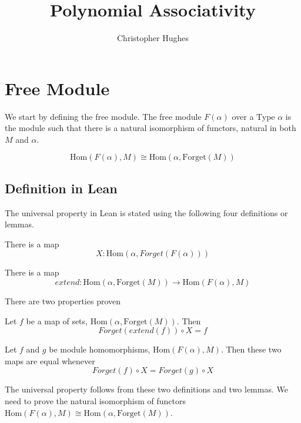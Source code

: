 \documentclass[12pt]{article} %
\title{Polynomial Associativity}
\author{Christopher Hughes}
\theoremstyle{definition}
\theoremstyle{definition}
\theoremstyle{definition}
\theoremstyle{definition}
\begin{document}
\section{Free Module}

We start by defining the free module. The free module $F(\alpha)$ over a Type $\alpha$ is the module
such that there is a natural isomorphism of functors, natural in both $M$ and $\alpha$.

\begin{equation}
\text{Hom}(F(\alpha), M) \cong \text{Hom}(\alpha, \text{Forget}(M))
\end{equation}

\subsection{Definition in Lean}

The universal property in Lean is stated using the following four definitions or lemmas.


There is a map \begin{equation}X : \text{Hom}(\alpha, Forget(F(\alpha)))\end{equation}



There is a map \begin{equation} extend : \text{Hom}(\alpha, \text{Forget}(M)) \rightarrow \text{Hom}(F(\alpha),M) \end{equation}

There are two properties proven 

\lemma\label{extendX}
  
Let $f$ be a map of sets, $\text{Hom}(\alpha, \text{Forget}(M))$. Then
  \begin{equation}
    Forget(extend (f)) \circ X = f 
  \end{equation}


  
Let $f$ and $g$ be module homomorphisms, $\text{Hom}(F(\alpha), M)$. Then these two maps are equal whenever
  \begin{equation}
    Forget(f) \circ X = Forget(g) \circ X
  \end{equation}

The universal property follows from these two definitions and two lemmas.
We need to prove the natural isomorphism of functors 
$\text{Hom}(F(\alpha), M) \cong \text{Hom}(\alpha, \text{Forget}(M))$.
\end{document}
